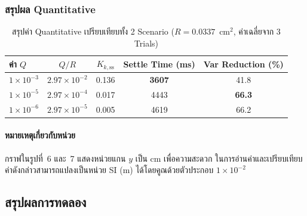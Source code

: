\subsubsection{สรุปผล Quantitative}

\begin{table}[htbp]
    \centering
    \caption{สรุปค่า Quantitative เปรียบเทียบทั้ง 2 Scenario
             ($R = 0.0337$~cm$^2$, ค่าเฉลี่ยจาก 3 Trials)}
    \label{tab:exp3_summary}
    \begin{tabular}{lcccc}
        \hline
        \textbf{ค่า $Q$}
            & \textbf{$Q/R$}
            & \textbf{$K_{k,\mathrm{ss}}$}
            & \textbf{Settle Time (ms)}
            & \textbf{Var Reduction (\%)} \\
        \hline
        $1\times10^{-3}$ & $2.97\times10^{-2}$ & 0.136 & \textbf{3607} & 41.8 \\
        $1\times10^{-5}$ & $2.97\times10^{-4}$ & 0.017 & 4443          & \textbf{66.3} \\
        $1\times10^{-6}$ & $2.97\times10^{-5}$ & 0.005 & 4619          & 66.2 \\
        \hline
    \end{tabular}
\end{table}

\paragraph{หมายเหตุเกี่ยวกับหน่วย}
กราฟในรูปที่~6 และ~7 แสดงหน่วยแกน $y$ เป็น cm เพื่อความสะดวก
ในการอ่านค่าและเปรียบเทียบ ค่าดังกล่าวสามารถแปลงเป็นหน่วย SI (m)
ได้โดยคูณด้วยตัวประกอบ $1 \times 10^{-2}$

\subsection{สรุปผลการทดลอง}

